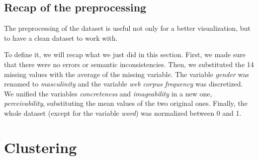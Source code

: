 \documentclass[a4paper,11pt,dvipsnames]{article}
\begin{document}




\subsection{Recap of the preprocessing}

The preprocessing of the dataset is useful not only for a better visualization, but  to have a clean dataset to work with. 


To define it, we will recap what we just did in this section.
First, we made sure that there were no errors or semantic inconsistencies. Then, we substituted the 14 missing values with the average of the missing variable. The variable \textit{gender} was renamed to \textit{masculinity} and the variable \textit{web corpus frequency} was discretized. We unified the variables \textit{concreteness} and \textit{imageability} in a new one, \textit{perceivability}, substituting the mean values of the two original ones. Finally, the whole dataset (except for the variable \textit{word}) was normalized between 0 and 1.

\section{Clustering}
\end{document}
